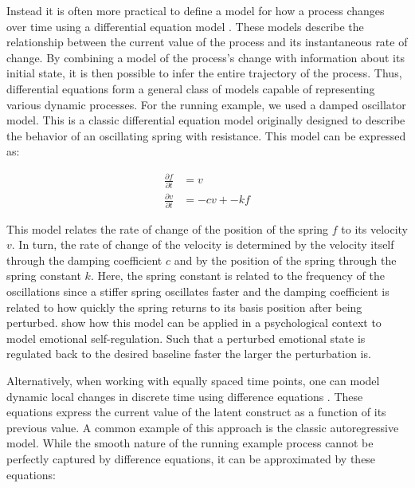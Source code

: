 \documentclass[man, floatsintext]{apa7}
\begin{document}
Instead it is often more practical to define a model for how a process changes
over
time using a differential equation model \parencite{cooper_dynamical_2012}.
These models describe the relationship between the current value of the process
and its instantaneous rate of change. By combining a model of the process's
change with information about its initial state, it is then possible to infer
the entire trajectory of the process. Thus,
differential equations form a general class of models capable of representing
various dynamic processes. For the running example, we used a damped oscillator
model. This is a classic differential equation model originally designed to
describe the
behavior of an oscillating spring with resistance. This model can be expressed
as:

\begin{equation}
  \begin{aligned}
    \frac{\partial f}{\partial t} & = v         \\
    \frac{\partial v}{\partial t} & = -cv + -kf
  \end{aligned}
\end{equation}

\noindent This model relates the rate of change of the position of the spring
$f$ to
its velocity $v$. In turn, the rate of change of the velocity is determined
by the velocity itself through the damping coefficient $c$ and by the
position of the spring through the spring constant $k$. Here, the spring
constant is related to the frequency of the oscillations since a stiffer
spring oscillates faster and the damping coefficient is related to how quickly
the spring returns to its basis position after being perturbed.
\textcite{chow_emotion_2005} show how this model can be applied in a
psychological context to model emotional self-regulation. Such that a perturbed
emotional state is regulated back to the desired baseline faster the larger
the perturbation is. %

Alternatively, when working with equally spaced time points, one can model
dynamic local changes in discrete time using difference equations
\parencite{durbin_time_2012}. These equations express the current value of the
latent construct as a function of its previous value.
A common example of this approach is the classic
autoregressive model. While the smooth nature of the running
example process cannot be perfectly captured by difference equations, it can be
approximated by these equations:
\end{document}
